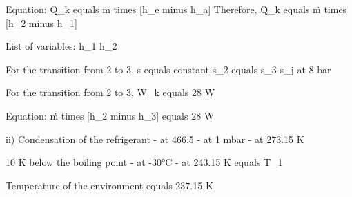 Equation: Q̇_k equals ṁ times [h_e minus h_a]
Therefore, Q̇_k equals ṁ times [h_2 minus h_1]

List of variables:
h_1
h_2

For the transition from 2 to 3, s equals constant
s_2 equals s_3
s_j at 8 bar

For the transition from 2 to 3, W_k equals 28 W

Equation: ṁ times [h_2 minus h_3] equals 28 W

ii) Condensation of the refrigerant
- at 466.5
- at 1 mbar
- at 273.15 K

10 K below the boiling point
- at -30°C
- at 243.15 K equals T_1

Temperature of the environment equals 237.15 K